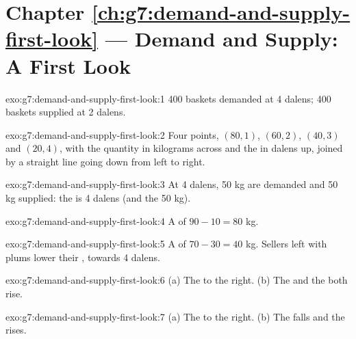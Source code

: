 \section*{Chapter \ref{ch:g7:demand-and-supply-first-look} --- Demand and Supply: A First Look}

\begin{solution}{exo:g7:demand-and-supply-first-look:1}
400 baskets demanded at 4 dalens; 400 baskets supplied at 2 dalens.
\end{solution}

\begin{solution}{exo:g7:demand-and-supply-first-look:2}
Four points, $(80, 1)$, $(60, 2)$, $(40, 3)$ and $(20, 4)$, with the quantity in kilograms
across and the  in dalens up, joined by a straight line going down from left to right.
\end{solution}

\begin{solution}{exo:g7:demand-and-supply-first-look:3}
At 4 dalens, 50 kg are demanded and 50 kg supplied: the  is 4 dalens (and
the  50 kg).
\end{solution}

\begin{solution}{exo:g7:demand-and-supply-first-look:4}
A  of $90 - 10 = 80$ kg.
\end{solution}

\begin{solution}{exo:g7:demand-and-supply-first-look:5}
A  of $70 - 30 = 40$ kg. Sellers left with plums lower their , towards
4 dalens.
\end{solution}

\begin{solution}{exo:g7:demand-and-supply-first-look:6}
(a) The   to the right. (b) The  and the  both rise.
\end{solution}

\begin{solution}{exo:g7:demand-and-supply-first-look:7}
(a) The   to the right. (b) The  falls and the  rises.
\end{solution}

